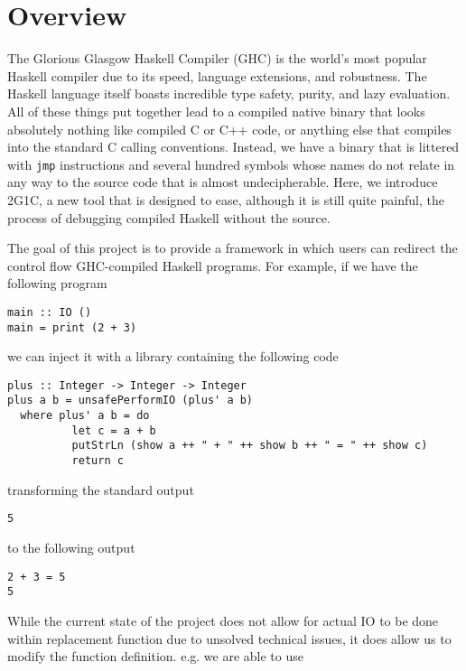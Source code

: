\documentclass[letterpaper]{article}
\begin{document}
\section{Overview}

The Glorious Glasgow Haskell Compiler (GHC) is the world's most popular Haskell
compiler due to its speed, language extensions, and robustness. The Haskell
language itself boasts incredible type safety, purity, and lazy evaluation. All
of these things put together lead to a compiled native binary that looks
absolutely nothing like compiled C or C++ code, or anything else that compiles
into the standard C calling conventions. Instead, we have a binary that is
littered with \texttt{jmp} instructions and several hundred symbols
whose names do not relate in any way to the source code that is almost
undecipherable. Here, we introduce 2G1C, a new tool that is designed to ease,
although it is still quite painful, the process of debugging compiled Haskell
without the source.

The goal of this project is to provide a framework in which users can redirect
the control flow GHC-compiled Haskell programs. For example, if we have the
following program

\begin{verbatim}
main :: IO ()
main = print (2 + 3)
\end{verbatim}

we can inject it with a library containing the following code

\begin{verbatim}
plus :: Integer -> Integer -> Integer
plus a b = unsafePerformIO (plus' a b)
  where plus' a b = do
          let c = a + b
          putStrLn (show a ++ " + " ++ show b ++ " = " ++ show c)
          return c
\end{verbatim}

transforming the standard output

\begin{verbatim}
5
\end{verbatim}

to the following output

\begin{verbatim}
2 + 3 = 5
5
\end{verbatim}

While the current state of the project does not allow for actual IO to be done
within replacement function due to unsolved technical issues, it does allow us
to modify the function definition. e.g. we are able to use
\end{document}
